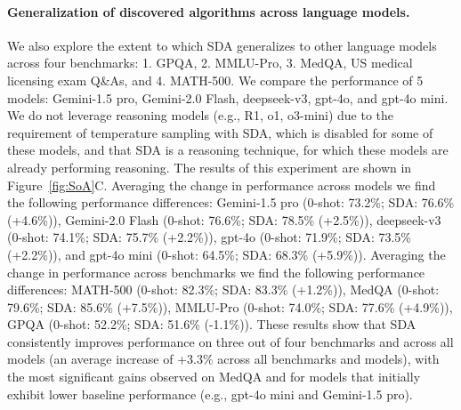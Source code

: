\documentclass[11pt, a4paper]{include/gdm_format}
\begin{document}
\paragraph{Generalization of discovered algorithms across language models.} We also explore the extent to which SDA generalizes to other language models across four benchmarks: 1. GPQA, 2. MMLU-Pro, 3. MedQA, US medical licensing exam Q\&As, and 4. MATH-500. We compare the performance of 5 models: Gemini-1.5 pro, Gemini-2.0 Flash, deepseek-v3, gpt-4o, and gpt-4o mini. We do not leverage reasoning models (e.g., R1, o1, o3-mini) due to the requirement of temperature sampling with SDA, which is disabled for some of these models, and that SDA is a reasoning technique, for which these models are already performing reasoning. The results of this experiment are shown in Figure~\ref{fig:SoA}C. Averaging the change in performance across models we find the following performance differences: Gemini-1.5 pro (0-shot: 73.2\%; SDA: 76.6\% ({\color{darkpastelgreen}+4.6\%})), Gemini-2.0 Flash (0-shot: 76.6\%; SDA: 78.5\% ({\color{darkpastelgreen}+2.5\%})), deepseek-v3 (0-shot: 74.1\%; SDA: 75.7\% ({\color{darkpastelgreen}+2.2\%})), gpt-4o (0-shot: 71.9\%; SDA: 73.5\% ({\color{darkpastelgreen}+2.2\%})), and gpt-4o mini (0-shot: 64.5\%; SDA: 68.3\% ({\color{darkpastelgreen}+5.9\%})). Averaging the change in performance across benchmarks we find the following performance differences: MATH‑500 (0-shot: 82.3\%; SDA: 83.3\% ({\color{darkpastelgreen}+1.2\%})), MedQA (0-shot: 79.6\%; SDA: 85.6\% ({\color{darkpastelgreen}+7.5\%})), MMLU‑Pro (0-shot: 74.0\%; SDA: 77.6\% ({\color{darkpastelgreen}+4.9\%})), GPQA (0-shot: 52.2\%; SDA: 51.6\% ({\color{darkpastelred}-1.1\%})). These results show that SDA consistently improves performance on three out of four benchmarks and across all models (an average increase of {\color{darkpastelgreen}+3.3\%} across all benchmarks and models), with the most significant gains observed on MedQA and for models that initially exhibit lower baseline performance (e.g., gpt-4o mini and Gemini-1.5 pro). 
\end{document}
